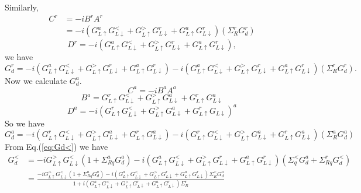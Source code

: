 \documentclass[11pt,a4paper]{book}
\begin{document}
Similarly, 
\begin{equation}
\begin{split}
C^{r}&=-iB^{r} A^{r} \\
&=-i(G_{L \uparrow}^{a} G_{L \downarrow}^{<}+G_{L \uparrow}^{>} G_{L \downarrow}^{r}+G_{L \uparrow}^{a} G_{L \downarrow}^{r})(\Sigma_{R}^{r} G_{d}^{r})
\end{split}
\end{equation}
\begin{equation}
D^{r}=-i(G_{L \uparrow}^{a} G_{L \downarrow}^{<}+G_{L \uparrow}^{>} G_{L \downarrow}^{r}+G_{L \uparrow}^{a} G_{L \downarrow}^{r}),
\end{equation}
we have
\begin{equation}
G_{d}^{r} =  -i(G_{L \uparrow}^{a} G_{L \downarrow}^{<}+G_{L \uparrow}^{>} G_{L \downarrow}^{r}+G_{L \uparrow}^{a} G_{L \downarrow}^{r})-i(G_{L \uparrow}^{a} G_{L \downarrow}^{<}+G_{L \uparrow}^{>} G_{L \downarrow}^{r}+G_{L \uparrow}^{a} G_{L \downarrow}^{r})(\Sigma_{R}^{r} G_{d}^{r}).
\end{equation}
Now we calculate $G_{d}^{a}$.
\begin{equation}
C^{a}=-iB^{a} A^{a}
\end{equation}
\begin{equation}
B^{a}=G_{L \uparrow}^{r} G_{L \downarrow}^{<}+G_{L \uparrow}^{>} G_{L \downarrow}^{a}+G_{L \uparrow}^{r} G_{L \downarrow}^{a}
\end{equation}
\begin{equation}
D^{a}=-i(G_{L \uparrow}^{r} G_{L \downarrow}^{<}+G_{L \uparrow}^{>} G_{L \downarrow}^{a}+G_{L \uparrow}^{r} G_{L \downarrow})
^{a}
\end{equation}
So we have
\begin{equation}
G_{d}^{a} = -i(G_{L \uparrow}^{r} G_{L \downarrow}^{<}+G_{L \uparrow}^{>} G_{L \downarrow}^{a}+G_{L \uparrow}^{r} G_{L \downarrow}
^{a})-i(G_{L \uparrow}^{r} G_{L \downarrow}^{<}+G_{L \uparrow}^{>} G_{L \downarrow}^{a}+G_{L \uparrow}^{r} G_{L \downarrow}^{a})(\Sigma_{R}^{a} G_{d}^{a})
\end{equation}
From Eq.(\ref{eq:Gd<}) we have
\begin{equation}
\begin{split}
G_{d}^{<}&=-i G_{L \uparrow}^{>} G_{L \downarrow}^{<}\left(1+\Sigma_{R q}^{a} G_{d}^{a}\right)-i\left(G_{L \uparrow}^{a} G_{L \downarrow}^{<}+G_{L \uparrow}^{>} G_{L \downarrow}^{r}+G_{L \uparrow}^{a} G_{L \downarrow}^{r}\right)\left(\Sigma_{q}^{<} G_{d}^{a}+\Sigma_{R q}^{r} G_{d}^{<}\right)\\
&=\frac{-i G_{L \uparrow}^{>} G_{L \downarrow}^{<}\left(1+\Sigma_{R q}^{a} G_{d}^{a}\right) - i\left(G_{L \uparrow}^{a} G_{L \downarrow}^{<}+G_{L \uparrow}^{>} G_{L \downarrow}^{r}+G_{L \uparrow}^{a} G_{L \downarrow}^{r}\right)\Sigma_{R}^{<} G_{d}^{a}}{1+i\left(G_{L \uparrow}^{a} G_{L \downarrow}^{<}+G_{L \uparrow}^{>} G_{L \downarrow}^{r}+G_{L \uparrow}^{a} G_{L \downarrow}^{r}\right)\Sigma_{R}^{r}}
\end{split}
\end{equation}
\end{document}

